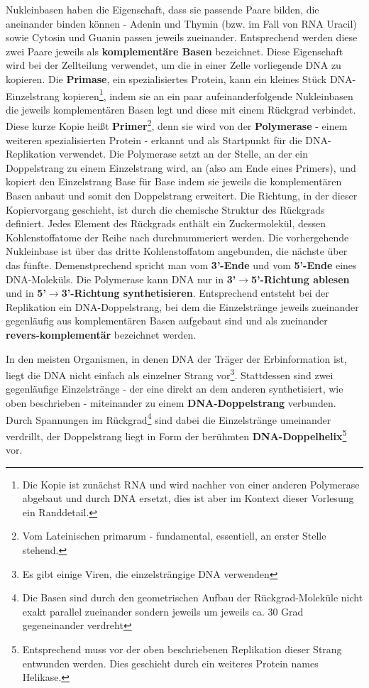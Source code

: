  Nukleinbasen haben die Eigenschaft, dass sie passende Paare bilden, die aneinander binden können - Adenin und Thymin (bzw. im Fall von RNA Uracil) sowie Cytosin und Guanin passen jeweils zueinander. Entsprechend werden diese zwei Paare jeweils als \textbf{komplementäre Basen} bezeichnet. Diese Eigenschaft wird bei der Zellteilung verwendet, um die in einer Zelle vorliegende DNA zu kopieren. Die \textbf{Primase}, ein spezialisiertes Protein, kann ein kleines Stück DNA-Einzelstrang kopieren\footnote{Die Kopie ist zunächst RNA und wird nachher von einer anderen Polymerase abgebaut und durch DNA ersetzt, dies ist aber im Kontext dieser Vorlesung ein Randdetail.}, indem sie an ein paar aufeinanderfolgende Nukleinbasen die jeweils komplementären Basen legt und diese mit einem Rückgrad verbindet. Diese kurze Kopie heißt \textbf{Primer}\footnote{Vom Lateinischen primarum - fundamental, essentiell, an erster Stelle stehend.}, denn sie wird von der \textbf{Polymerase} - einem weiteren spezialisierten Protein - erkannt und als Startpunkt für die DNA-Replikation verwendet. Die Polymerase setzt an der Stelle, an der ein Doppelstrang zu einem Einzelstrang wird, an (also am Ende eines Primers), und kopiert den Einzelstrang Base für Base indem sie jeweils die komplementären Basen anbaut und somit den Doppelstrang erweitert. Die Richtung, in der dieser Kopiervorgang geschieht, ist durch die chemische Struktur des Rückgrads definiert. Jedes Element des Rückgrads enthält ein Zuckermolekül, dessen Kohlenstoffatome der Reihe nach durchnummeriert werden. Die vorhergehende Nukleinbase ist über das dritte Kohlenstoffatom angebunden, die nächste über das fünfte. Demenstprechend spricht man vom \textbf{3'-Ende} und vom \textbf{5'-Ende} eines DNA-Moleküls. Die Polymerase kann DNA nur in \textbf{3'$\rightarrow$5'-Richtung ablesen} und in \textbf{5'$\rightarrow$3'-Richtung synthetisieren}. Entsprechend entsteht bei der Replikation ein DNA-Doppelstrang, bei dem die Einzelstränge jeweils zueinander gegenläufig aus komplementären Basen aufgebaut sind und als zueinander \textbf{revers-komplementär} bezeichnet werden.

  In den meisten Organismen, in denen DNA der Träger der Erbinformation ist, liegt die DNA nicht einfach als einzelner Strang vor\footnote{Es gibt einige Viren, die einzelsträngige DNA verwenden}. Stattdessen sind zwei gegenläufige Einzelstränge - der eine direkt an dem anderen synthetisiert, wie oben beschrieben - miteinander zu einem \textbf{DNA-Doppelstrang} verbunden. Durch Spannungen im Rückgrad\footnote{Die Basen sind durch den geometrischen Aufbau der Rückgrad-Moleküle nicht exakt parallel zueinander sondern jeweils um jeweils ca. 30 Grad gegeneinander verdreht} sind dabei die Einzelstränge umeinander verdrillt, der Doppelstrang liegt in Form der berühmten \textbf{DNA-Doppelhelix}\footnote{Entsprechend muss vor der oben beschriebenen Replikation dieser Strang entwunden werden. Dies geschieht durch ein weiteres Protein names Helikase.} vor. 

